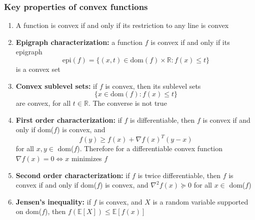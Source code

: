 \documentclass[a4paper]{article}
\begin{document}
{\begin{enumerate}
\end{enumerate}

\subsubsection{Key properties of convex functions}
\begin{enumerate}
  \item A function is convex if and only if its restriction to any line is convex
  \item \textbf{Epigraph characterization:} a function $f$ is convex if and only if its epigraph
  \[
    \text{epi}(f) = \{(x,t) \in \text{dom}(f) \times \mathbb{R} : f(x) \leq t \}
  \]
  is a convex set
  \item \textbf{Convex sublevel sets:} if $f$ is convex, then its sublevel sets 
  \[
    \{x \in \text{dom}(f) : f(x) \leq t \}
  \]
  are convex, for all $t \in \mathbb{R}$. The converse is not true
  \item \textbf{First order characterization:} if $f$ is differentiable, then $f$ is convex if and only if dom($f$) is convex, and
  \[
    f(y) \geq f(x) + \nabla f(x)^T(y-x)
  \]
  for all $x, y \in $ dom($f$). Therefore for a differentiable convex function $ \nabla f(x) = 0 \Leftrightarrow x$ minimizes $f$
  \item \textbf{Second order characterization:} if $f$ is twice differentiable, then $f$ is convex if and only if dom($f$) is convex, and $\nabla^2 f(x) \succeq 0$ for all $x \in $ dom($f$)
  \item \textbf{Jensen's inequality:} if $f$ is convex, and $X$ is a random variable supported on dom($f$), then $f(\mathbb{E}[X]) \leq \mathbb{E}[f(x)]$
\end{enumerate}

}
\end{document}
